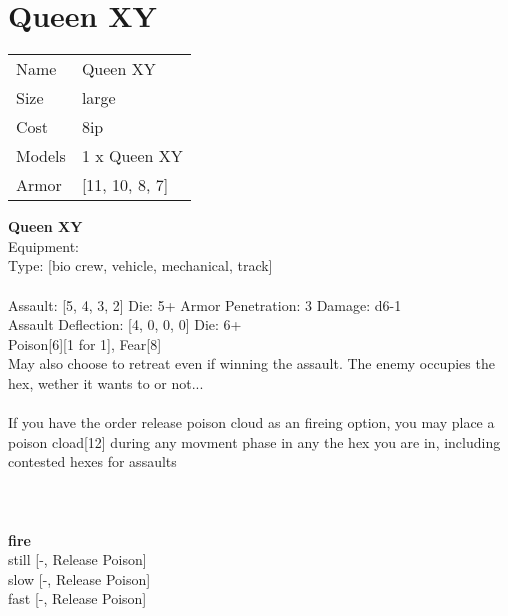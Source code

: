 \pagebreak\pagebreak

\section{ Queen XY }

\begin{tabular}{ll}
  Name & Queen XY \\
  Size & large\\
  Cost & 8ip\\
  Models & 1 x Queen XY\\
  Armor & [11, 10, 8, 7]\\
\end{tabular}

\noindent 

{\bf Queen XY } \\
Equipment:  \\
Type: [bio crew, vehicle, mechanical, track] \\
\ \\
Assault: [5, 4, 3, 2] Die: 5+ Armor Penetration: 3 Damage: d6-1 \\
Assault Deflection: [4, 0, 0, 0] Die: 6+\\
\indent Poison[6][1 for 1], Fear[8]\\ 
May also choose to retreat even if winning the assault. The enemy occupies the hex, wether it wants to or not...\\ 
 
\ \\
If you have the order release poison cloud as an fireing option, you may place a poison cload[12] during any movment phase in any the hex you are in, including contested hexes for assaults\\ 

\ \\
 
\ \\




\ \\ {\bf fire } \\
still [-, Release Poison] \\
slow [-, Release Poison] \\
fast [-, Release Poison] \\


